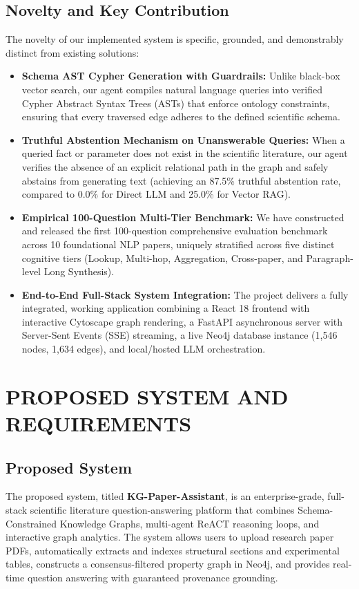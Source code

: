 \documentclass[12pt,a4paper,oneside]{report}
\begin{document}
\section{Novelty and Key Contribution}
The novelty of our implemented system is specific, grounded, and demonstrably distinct from existing solutions:
\begin{itemize}
    \item \textbf{Schema AST Cypher Generation with Guardrails:} Unlike black-box vector search, our agent compiles natural language queries into verified Cypher Abstract Syntax Trees (ASTs) that enforce ontology constraints, ensuring that every traversed edge adheres to the defined scientific schema.
    \item \textbf{Truthful Abstention Mechanism on Unanswerable Queries:} When a queried fact or parameter does not exist in the scientific literature, our agent verifies the absence of an explicit relational path in the graph and safely abstains from generating text (achieving an 87.5\% truthful abstention rate, compared to 0.0\% for Direct LLM and 25.0\% for Vector RAG).
    \item \textbf{Empirical 100-Question Multi-Tier Benchmark:} We have constructed and released the first 100-question comprehensive evaluation benchmark across 10 foundational NLP papers, uniquely stratified across five distinct cognitive tiers (Lookup, Multi-hop, Aggregation, Cross-paper, and Paragraph-level Long Synthesis).
    \item \textbf{End-to-End Full-Stack System Integration:} The project delivers a fully integrated, working application combining a React 18 frontend with interactive Cytoscape graph rendering, a FastAPI asynchronous server with Server-Sent Events (SSE) streaming, a live Neo4j database instance (1,546 nodes, 1,634 edges), and local/hosted LLM orchestration.
\end{itemize}




\chapter{PROPOSED SYSTEM AND REQUIREMENTS}

\section{Proposed System}
The proposed system, titled \textbf{KG-Paper-Assistant}, is an enterprise-grade, full-stack scientific literature question-answering platform that combines Schema-Constrained Knowledge Graphs, multi-agent ReACT reasoning loops, and interactive graph analytics. The system allows users to upload research paper PDFs, automatically extracts and indexes structural sections and experimental tables, constructs a consensus-filtered property graph in Neo4j, and provides real-time question answering with guaranteed provenance grounding.
\end{document}
